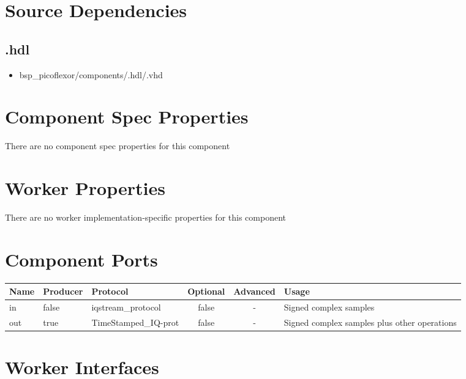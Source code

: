 \section*{Source Dependencies}
\subsection*{\comp.hdl}
\begin{itemize}
	\item bsp\_picoflexor/components/\comp.hdl/\comp.vhd
\end{itemize}

\begin{landscape}
	\section*{Component Spec Properties}
	There are no component spec properties for this component
	
	\section*{Worker Properties}
	There are no worker implementation-specific properties for this component
	
	\section*{Component Ports}
	\begin{scriptsize}
		\begin{tabular}{|M{2cm}|M{1.5cm}|M{4cm}|c|c|M{9cm}|}
			\hline
			Name & Producer & Protocol                       & Optional & Advanced & Usage                                  		\\
			\hline
			in   & false    & iqstream\_protocol			 & false    & -        & Signed complex samples 						\\
			\hline
			out  & true     & TimeStamped\_IQ-prot           & false    & -        & Signed complex samples plus other operations   \\
			\hline
		\end{tabular}
	\end{scriptsize}
	\section*{Worker Interfaces}

\end{landscape}
